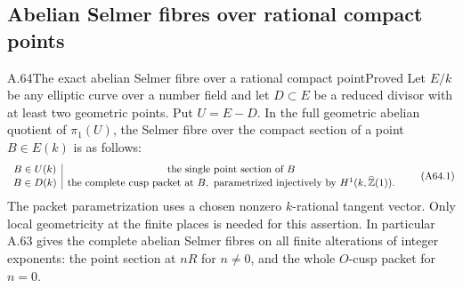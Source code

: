 \subsection{Abelian Selmer fibres over rational compact points}

\begin{statement}{A.64}{The exact abelian Selmer fibre over a rational compact point}{Proved}
Let $E/k$ be any elliptic curve over a number field and let
$D\subset E$ be a reduced divisor with at least two geometric
points. Put $U=E-D$. In the full geometric abelian quotient of
$\pi_1(U)$, the Selmer fibre over the compact section of a point
$B\in E(k)$ is as follows:
\[
 \begin{array}{c|c}
 B\in U(k)&\text{the single point section of }B\\
 B\in D(k)&\text{the complete cusp packet at }B,
          \text{ parametrized injectively by }H^1(k,\widehat{\mathbb Z}(1)).
 \end{array}
 \tag{A64.1}
\]
The packet parametrization uses a chosen nonzero $k$-rational
tangent vector. Only local geometricity at the finite places is
needed for this assertion. In particular A.63 gives the complete
abelian Selmer fibres on all finite alterations of integer
exponents: the point section at $nR$ for $n\ne0$, and the whole
$O$-cusp packet for $n=0$.
\end{statement}

